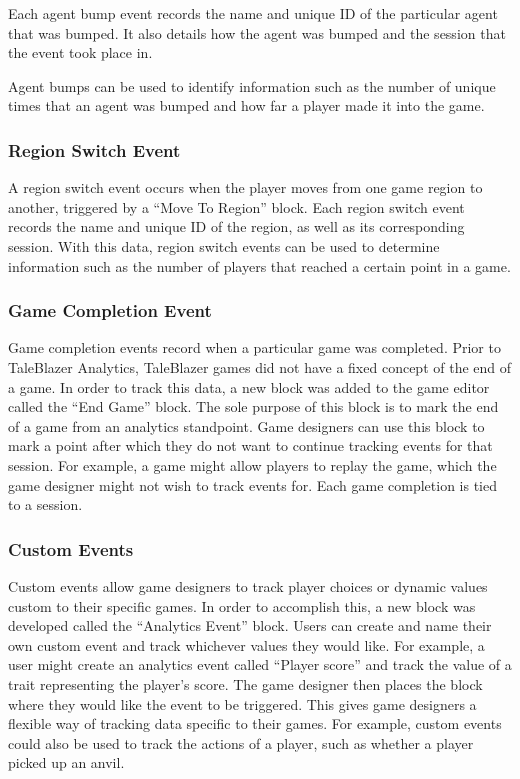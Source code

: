 Each agent bump event records the name and unique ID of the particular agent that was bumped. It also details how the agent was bumped and the session that the event took place in. 

Agent bumps can be used to identify information such as the number of unique times that an agent was bumped and how far a player made it into the game. 

\subsubsection{Region Switch Event}

A region switch event occurs when the player moves from one game region to another, triggered by a ``Move To Region'' block. Each region switch event records the name and unique ID of the region, as well as its corresponding session. With this data, region switch events can be used to determine information such as the number of players that reached a certain point in a game.

\subsubsection{Game Completion Event}

Game completion events record when a particular game was completed. Prior to TaleBlazer Analytics, TaleBlazer games did not have a fixed concept of the end of a game. In order to track this data, a new block was added to the game editor called the ``End Game'' block. The sole purpose of this block is to mark the end of a game from an analytics standpoint. Game designers can use this block to mark a point after which they do not want to continue tracking events for that session. For example, a game might allow players to replay the game, which the game designer might not wish to track events for. Each game completion is tied to a session. 

\subsubsection{Custom Events}

Custom events allow game designers to track player choices or dynamic values custom to their specific games. In order to accomplish this, a new block was developed called the ``Analytics Event'' block. Users can create and name their own custom event and track whichever values they would like. For example, a user might create an analytics event called ``Player score'' and track the value of a trait representing the player's score. The game designer then places the block where they would like the event to be triggered. This gives game designers  a flexible way of tracking data specific to their games. For example, custom events could also be used to track the actions of a player, such as whether a player picked up an anvil. 

